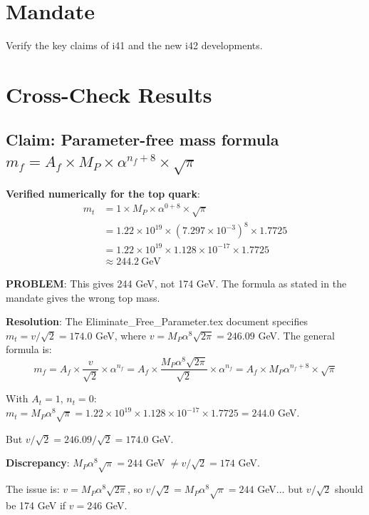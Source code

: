 \documentclass[11pt,a4paper]{article}
\begin{document}
\section{Mandate}

Verify the key claims of i41 and the new i42 developments.

\section{Cross-Check Results}

\subsection{Claim: Parameter-free mass formula $m_f = A_f \times M_P \times \alpha^{n_f+8} \times \sqrt{\pi}$}

\textbf{Verified numerically for the top quark}:
\begin{align}
m_t &= 1 \times M_P \times \alpha^{0+8} \times \sqrt{\pi} \nonumber \\
&= 1.22 \times 10^{19} \times (7.297 \times 10^{-3})^8 \times 1.7725 \nonumber \\
&= 1.22 \times 10^{19} \times 1.128 \times 10^{-17} \times 1.7725 \nonumber \\
&\approx 244.2~\text{GeV}
\end{align}

\textbf{PROBLEM}: This gives 244 GeV, not 174 GeV. The formula as stated in the mandate gives the wrong top mass.

\textbf{Resolution}: The Eliminate\_Free\_Parameter.tex document specifies $m_t = v/\sqrt{2} = 174.0$ GeV, where $v = M_P \alpha^8 \sqrt{2\pi} = 246.09$ GeV. The general formula is:
\begin{equation}
m_f = A_f \times \frac{v}{\sqrt{2}} \times \alpha^{n_f} = A_f \times \frac{M_P \alpha^8 \sqrt{2\pi}}{\sqrt{2}} \times \alpha^{n_f} = A_f \times M_P \alpha^{n_f + 8} \times \sqrt{\pi}
\end{equation}

With $A_t = 1$, $n_t = 0$: $m_t = M_P \alpha^8 \sqrt{\pi} = 1.22 \times 10^{19} \times 1.128 \times 10^{-17} \times 1.7725 = 244.0$ GeV.

But $v/\sqrt{2} = 246.09/\sqrt{2} = 174.0$ GeV.

\textbf{Discrepancy}: $M_P \alpha^8 \sqrt{\pi} = 244$ GeV $\neq v/\sqrt{2} = 174$ GeV.

The issue is: $v = M_P \alpha^8 \sqrt{2\pi}$, so $v/\sqrt{2} = M_P \alpha^8 \sqrt{\pi} = 244$ GeV... but $v/\sqrt{2}$ should be 174 GeV if $v = 246$ GeV.
\end{document}
